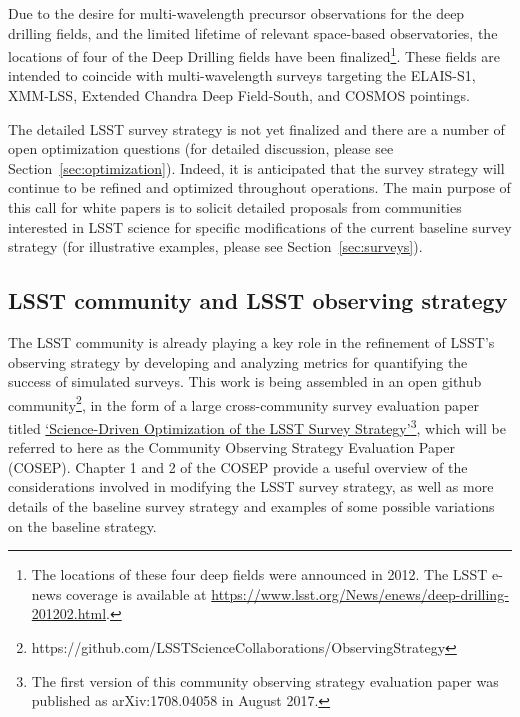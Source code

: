 \documentclass[DM,lsstdraft,toc,usenatbib]{lsstdoc}
\begin{document}
Due to the desire for multi-wavelength precursor observations for the deep drilling fields, and the limited lifetime of relevant 
space-based observatories, the locations of four of the Deep Drilling fields have been finalized\footnote{The locations
of these four deep fields were announced in 2012. The LSST e-news coverage is available at 
\href{https://www.lsst.org/News/enews/deep-drilling-201202.html}{https://www.lsst.org/News/enews/deep-drilling-201202.html}.}. 
These fields are intended to coincide with multi-wavelength surveys targeting the ELAIS-S1, XMM-LSS, Extended Chandra Deep Field-South, 
and COSMOS pointings. 

The detailed LSST survey strategy is not yet finalized and there
are a number of open optimization questions (for detailed discussion, please see Section~\ref{sec:optimization}). 
Indeed, it is anticipated that the survey strategy 
will continue to be refined and optimized throughout operations. The main purpose of this 
call for white papers is to solicit detailed proposals from communities interested in LSST science
for specific modifications of the current baseline survey strategy (for illustrative examples, 
please see Section~\ref{sec:surveys}). 


\subsection{LSST community and LSST observing strategy}

The LSST community is already playing a key role in the refinement of LSST's observing strategy 
by developing and analyzing metrics for quantifying the success of simulated surveys.
This work is being assembled in an open github community\footnote{
https://github.com/LSSTScienceCollaborations/ObservingStrategy}, 
in the form of a large cross-community survey evaluation paper
titled \href{http://ls.st/9fw}{`Science-Driven Optimization of the LSST Survey Strategy'}\footnote{The first 
version of this community observing strategy evaluation paper was published as arXiv:1708.04058 in August 2017.},
which will be referred to here as the Community Observing Strategy Evaluation Paper (COSEP). 
Chapter 1 and 2 of the COSEP provide a useful overview of the considerations involved in 
modifying the LSST survey strategy, as well as more details of the baseline survey strategy and 
examples of some possible variations on the baseline strategy. 
\end{document}
